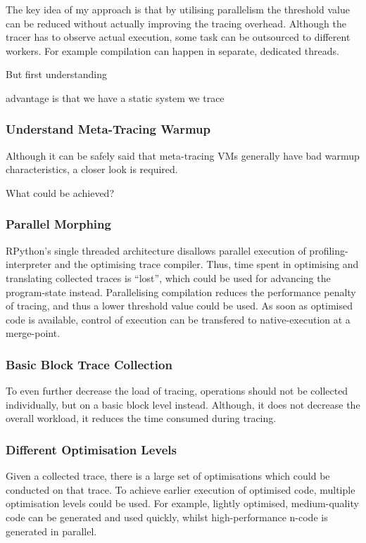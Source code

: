 The key idea of my approach is that by utilising parallelism the threshold value
can be reduced without actually improving the tracing overhead. Although the
tracer has to observe actual execution, some task can be outsourced to different
workers. For example compilation can happen in separate, dedicated threads.

But first understanding

advantage is that we have a static system we trace


\subsubsection{Understand Meta-Tracing Warmup}

Although it can be safely said that meta-tracing VMs generally have bad warmup
characteristics, a closer look is required.

What could be achieved?


\subsubsection{Parallel Morphing} RPython's single threaded architecture disallows
parallel execution of profiling-interpreter and the optimising trace compiler.
Thus, time spent in optimising and translating collected traces is ``lost'',
which could be used for advancing the program-state instead. Parallelising
compilation reduces the performance penalty of tracing, and thus a lower
threshold value could be used. As soon as optimised code is available, control
of execution can be transfered to native-execution at a merge-point.

\subsubsection{Basic Block Trace Collection} To even further decrease the load of
tracing, operations should not be collected individually, but on a basic block
level instead. Although, it does not decrease the overall workload, it reduces
the time consumed during tracing.

\subsubsection{Different Optimisation Levels}

Given a collected trace, there is a large set of optimisations which could be
conducted on that trace. To achieve earlier execution of
optimised code, multiple optimisation levels could be used. For example,
lightly optimised, medium-quality code can be generated and used quickly, whilst
high-performance n-code is generated in parallel.

